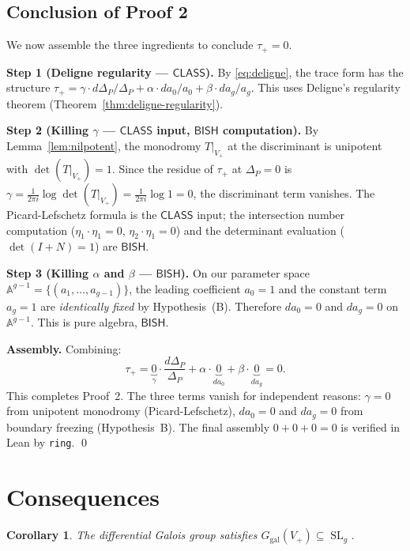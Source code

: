 \documentclass[11pt]{article}
\theoremstyle{plain}
\newtheorem{corollary}[theorem]{Corollary}
\theoremstyle{definition}
\theoremstyle{remark}
\newcommand{\SL}{\operatorname{SL}}
\newcommand{\BISH}{\mathsf{BISH}}
\newcommand{\CLASS}{\mathsf{CLASS}}
\begin{document}
\subsection{Conclusion of Proof 2}\label{subsec:proof2-conclusion}

We now assemble the three ingredients to conclude $\tau_+ = 0$.

\textbf{Step 1 (Deligne regularity --- $\CLASS$).}  By \eqref{eq:deligne}, the trace form
has the structure
$\tau_+ = \gamma \cdot d\Delta_P/\Delta_P + \alpha \cdot da_0/a_0 + \beta \cdot da_g/a_g$.
This uses Deligne's regularity theorem (Theorem~\ref{thm:deligne-regularity}).

\textbf{Step 2 (Killing $\gamma$ --- $\CLASS$ input, $\BISH$ computation).}
By Lemma~\ref{lem:nilpotent}, the
monodromy $T|_{V_+}$ at the discriminant is unipotent with $\det(T|_{V_+}) = 1$.
Since the residue of $\tau_+$ at $\Delta_P = 0$ is $\gamma = \frac{1}{2\pi i}\log\det(T|_{V_+})
= \frac{1}{2\pi i}\log 1 = 0$, the discriminant term vanishes.
The Picard-Lefschetz formula is the $\CLASS$ input; the intersection number
computation ($\eta_1 \cdot \eta_1 = 0$, $\eta_2 \cdot \eta_1 = 0$) and the
determinant evaluation ($\det(I+N) = 1$) are $\BISH$.

\textbf{Step 3 (Killing $\alpha$ and $\beta$ --- $\BISH$).}  On our parameter space
$\mathbb{A}^{g-1} = \{(a_1, \ldots, a_{g-1})\}$, the leading coefficient $a_0 = 1$
and the constant term $a_g = 1$ are \emph{identically fixed} by Hypothesis~(B).
Therefore $da_0 = 0$ and $da_g = 0$ on $\mathbb{A}^{g-1}$.  This is pure algebra,
$\BISH$.

\textbf{Assembly.}
Combining:
\[
  \tau_+ = \underbrace{0}_{\gamma} \cdot \frac{d\Delta_P}{\Delta_P}
         + \alpha \cdot \underbrace{0}_{da_0}
         + \beta \cdot \underbrace{0}_{da_g} = 0.
\]
This completes Proof~2.  The three terms vanish for independent reasons:
$\gamma = 0$ from unipotent monodromy (Picard-Lefschetz),
$da_0 = 0$ and $da_g = 0$ from boundary freezing (Hypothesis~B).
The final assembly $0 + 0 + 0 = 0$ is verified in Lean by \texttt{ring}. \qed


\section{Consequences}\label{sec:consequences}

\begin{corollary}\label{cor:slg}
  The differential Galois group satisfies $G_\mathrm{gal}(V_+) \subseteq \SL_g$.
\end{corollary}
\end{document}
